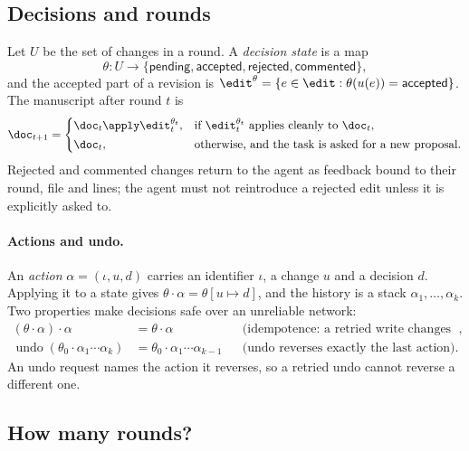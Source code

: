 \subsection{Decisions and rounds}

Let $U$ be the set of changes in a round. A \emph{decision state} is a map
\begin{equation}
  \theta : U \to \{\textsf{pending}, \textsf{accepted}, \textsf{rejected},
  \textsf{commented}\},
\end{equation}
and the accepted part of a revision is
$\edit^{\theta} = \{ e \in \edit : \theta(u(e)) = \textsf{accepted} \}$.
The manuscript after round $t$ is
\begin{equation}
  \doc_{t+1} =
  \begin{cases}
    \doc_t \apply \edit_t^{\theta_t}, & \text{if } \edit_t^{\theta_t}
      \text{ applies cleanly to } \doc_t,\\[2pt]
    \doc_t, & \text{otherwise, and the task is asked for a new proposal.}
  \end{cases}
  \label{eq:round}
\end{equation}
Rejected and commented changes return to the agent as feedback bound to their
round, file and lines; the agent must not reintroduce a rejected edit unless it
is explicitly asked to.

\paragraph{Actions and undo.}
An \emph{action} $\alpha = (\iota, u, d)$ carries an identifier $\iota$, a
change $u$ and a decision $d$. Applying it to a state gives
$\theta \cdot \alpha = \theta[u \mapsto d]$, and the history is a stack
$\alpha_1, \dots, \alpha_k$. Two properties make decisions safe over an
unreliable network:
\begin{align}
  (\theta \cdot \alpha) \cdot \alpha &= \theta \cdot \alpha
    && \text{(idempotence: a retried write changes nothing)},
    \label{eq:idempotent}\\
  \operatorname{undo}(\theta_0 \cdot \alpha_1 \cdots \alpha_k)
    &= \theta_0 \cdot \alpha_1 \cdots \alpha_{k-1}
    && \text{(undo reverses exactly the last action)}.
    \label{eq:undo}
\end{align}
An undo request names the action it reverses, so a retried undo cannot reverse
a different one.

\subsection{How many rounds?}


